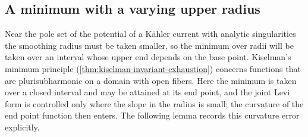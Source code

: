 
\subsection{A minimum with a varying upper radius}
\label{sec:varying-radius-minimum}
Near the pole set of the potential of a K\"ahler current with analytic singularities the smoothing radius must be taken smaller, so the minimum over radii will be taken over an interval whose upper end depends on the base point. Kiselman's minimum principle (\cref{thm:kiselman-invariant-exhaustion}) concerns functions that are plurisubharmonic on a domain with open fibers. Here the minimum is taken over a closed interval and may be attained at its end point, and the joint Levi form is controlled only where the slope in the radius is small; the curvature of the end point function then enters. The following lemma records this curvature error explicitly.

